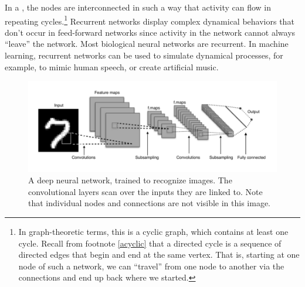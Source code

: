 
In a , the nodes are interconnected in such a way that activity can flow in repeating cycles.\footnote{In graph-theoretic terms, this is a cyclic graph, which contains at least one cycle. Recall from footnote \ref{acyclic} that a directed cycle is a sequence of directed edges that begin and end at the same vertex. That is, starting at one node of such a network, we can ``travel'' from one node to another via the connections and end up back where we started.} Recurrent networks display complex dynamical behaviors that don't occur in feed-forward networks since activity in the network cannot always ``leave'' the network. Most biological neural networks are recurrent. In machine learning, recurrent networks can be used to simulate dynamical processes, for example,  to mimic human speech, or create artificial music.

\begin{figure}[h]
\centering
\includegraphics[scale=.45]{./images/deepNet.png}
\caption[Adapted from a creative commons image by Aphex34 at \url{https://commons.wikimedia.org/wiki/File:Typical_cnn.png} ]{A deep neural network, trained to recognize images. The convolutional layers scan over the inputs they are linked to. Note that individual nodes and connections are not visible in this image.}
\label{deep_net}
\end{figure}



